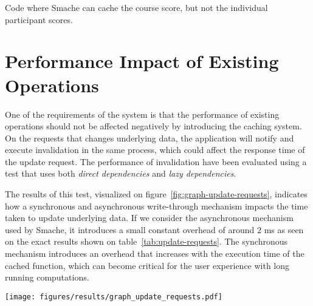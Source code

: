 \begin{code}{Code where Smache can cache the course score, but not the individual participant scores.}
  
  \label{code:running-example-non-cachable}
\end{code}


\section{Performance Impact of Existing Operations}
\label{sec:performance-impact-of-existing-procedures}

One of the requirements of the system is that the performance of existing operations should not be affected negatively by introducing the caching system. On the requests that changes underlying data, the application will notify and execute invalidation in the same process, which could affect the response time of the update request. The performance of invalidation have been evaluated using a test that uses both \emph{direct dependencies} and \emph{lazy dependencies}.

The results of this test, visualized on figure~\ref{fig:graph-update-requests}, indicates how a synchronous and asynchronous write-through mechanism impacts the time taken to update underlying data. If we consider the asynchronous mechanism used by Smache, it introduces a small constant overhead of around $2$ ms as seen on the exact results shown on table~\ref{tab:update-requests}. The synchronous mechanism introduces an overhead that increases with the execution time of the cached function, which can become critical for the user experience with long running computations.

\begin{figure*}[ht!]
  \centering
  \texttt{[image: figures/results/graph\_update\_requests.pdf]}
  \caption{Impact of introducing synchronous and asynchronous write-through in a case, where the update affects a single cached object instance with variable execution time.}
  \label{fig:graph-update-requests}
\end{figure*}

